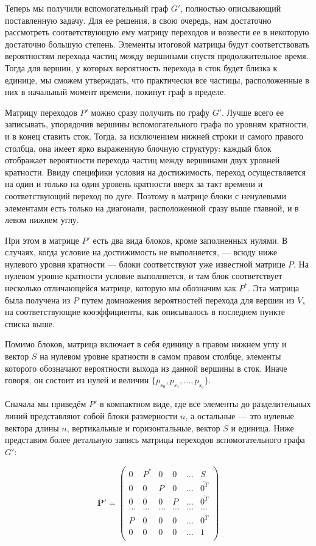 Теперь мы получили вспомогательный граф $G'$, полностью описывающий поставленную задачу. Для ее решения, в свою очередь, нам достаточно рассмотреть соответствующую ему матрицу переходов и возвести ее в некоторую достаточно большую степень. Элементы итоговой матрицы будут соответствовать вероятностям перехода частиц между вершинами спустя продолжительное время. Тогда для вершин, у которых вероятность перехода в сток будет близка к единице, мы сможем утверждать, что практически все частицы, расположенные в них в начальный момент времени, покинут граф в пределе. 

Матрицу переходов $P'$ можно сразу получить по графу $G'$. Лучше всего ее записывать, упорядочив вершины вспомогательного графа по уровням кратности, и в конец ставить сток. Тогда, за исключением нижней строки и самого правого столбца, она имеет ярко выраженную блочную структуру: каждый блок отображает вероятности перехода частиц между вершинами двух уровней кратности. Ввиду специфики условия на достижимость, переход осуществляется на один и только на один уровень кратности вверх за такт времени и соответствующий переход по дуге. Поэтому в матрице блоки с ненулевыми элементами есть только на диагонали, расположенной сразу выше главной, и в левом нижнем углу. 

При этом в матрице $P'$ есть два вида блоков, кроме заполненных нулями. В случаях, когда условие на достижимость не выполняется, --- всюду ниже нулевого уровня кратности --- блоки соответствуют уже известной матрице $P$. На нулевом уровне кратности условие выполняется, и там блок соответствует несколько отличающейся матрице, которую мы обозначим как $P^*$. Эта матрица была получена из $P$ путем домножения вероятностей перехода для вершин из $V_s$ на соответствующие кооэффициенты, как описывалось в последнем пункте списка выше.

Помимо блоков, матрица включает в себя единицу в правом нижнем углу и вектор $S$ на нулевом уровне кратности в самом правом столбце, элементы которого обозначают вероятности выхода из данной вершины в сток.	Иначе говоря, он состоит из нулей и величин $\{p_{s_0}, p_{s_1}, ... , p_{s_q}\}$.

Сначала мы приведём $P'$ в компактном виде, где все элементы до разделительных линий представляют собой блоки размерности $n$, а остальные --- это нулевые вектора длины $n$, вертикальные и горизонтальные, вектор $S$ и единица. Ниже представим более детальную запись матрицы переходов вспомогательного графа $G'$:

\begin{displaymath}
\mathbf{P'} =
\left( \begin{array}{ccccc|c}
0 & P^* & 0 & 0 & ... & S \\
0 & 0 & P & 0 & ... & \overline {0^T} \\
0 & 0 & 0 & P & ... & \overline {0^T} \\
... & ... & ... & ... & ... & ... \\
P & 0 & 0 & 0 & ... & \overline {0^T} \\
\hline
\overline 0 &  \overline 0 &  \overline 0 &  \overline 0 & ... & 1 \\
\end{array} \right)
\end{displaymath}

